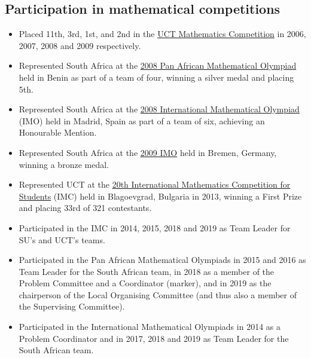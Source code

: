 \documentclass{article}
\begin{document}
\subsection{Participation in mathematical competitions}
\begin{itemize}
	\item Placed 11th, 3rd, 1st, and 2nd in the \href{http://www.mth.uct.ac.za/competition/}{UCT Mathematics Competition} in 2006, 2007, 2008 and 2009 respectively.
	\item Represented South Africa at the \href{http://www.pamo-official.org/en/opam_infos_annee.php?annee=2008&edition=18}{2008 Pan African Mathematical Olympiad} held in Benin as part of a team of four, winning a silver medal and placing 5th.
	\item Represented South Africa at the \href{http://www.imo-2008.es/}{2008 International Mathematical Olympiad} (IMO) held in Madrid, Spain as part of a team of six, achieving an Honourable Mention.
	\item Represented South Africa at the \href{http://www.imo-official.org/year_info.aspx?year=2009}{2009 IMO} held in Bremen, Germany, winning a bronze medal.
	\item Represented UCT at the \href{http://www.imc-math.org.uk/index.php?year=2013}{20th International Mathematics Competition for Students} (IMC) held in Blagoevgrad, Bulgaria in 2013, winning a First Prize and placing 33rd of 321 contestants.
	\item Participated in the IMC in 2014, 2015, 2018 and 2019 as Team Leader for SU's and UCT's teams.
	\item Participated in the Pan African Mathematical Olympiads in 2015 and 2016 as Team Leader for the South African team, in 2018 as a member of the Problem Committee and a Coordinator (marker), and in 2019 as the chairperson of the Local Organising Committee (and thus also a member of the Supervising Committee).
	\item Participated in the International Mathematical Olympiads in 2014 as a Problem Coordinator and in 2017, 2018 and 2019 as Team Leader for the South African team.
\end{itemize}
\end{document}
